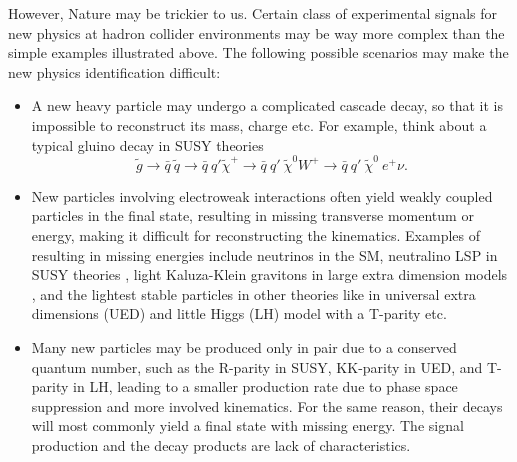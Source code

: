 \documentclass[prd,aps,floats,preprintnumbers,preprint,superscriptaddress,floatfix,nofootinbib]{revtex4}
\begin{document}
However, Nature may be trickier to us. Certain class of 
experimental signals for new physics at  hadron collider environments
may be way more complex than the simple examples illustrated above.
The following possible scenarios may make the new physics identification
difficult:
\begin{itemize}
\item A new heavy particle may undergo a complicated cascade decay, 
so that it is impossible to reconstruct its mass, charge etc. For example, think
about a typical gluino decay \cite{cascade} in SUSY theories 
$$\tilde g\to \bar q\ \tilde q \to \bar q\ q' \tilde\chi^+ \to \bar q\ q' \ \tilde\chi^0 W^+ 
\to \bar q\ q'  \ \tilde\chi^0\ e^+ \nu.$$
\item New particles involving electroweak interactions often yield weakly
coupled particles in the final state, resulting in missing transverse momentum
or energy, making it difficult for reconstructing the kinematics. 
Examples of resulting in missing energies 
include neutrinos in the SM, neutralino LSP in SUSY theories \cite{HaberKane}, 
light Kaluza-Klein gravitons in large extra dimension models \cite{GRW-HLZ},
and the lightest stable particles in other theories like in universal extra dimensions
(UED) \cite{UED} and little Higgs (LH) model with a T-parity \cite{T-P} etc.
\item Many new particles may be produced only in pair due to a conserved quantum
number, such as the R-parity in SUSY, KK-parity in UED, and T-parity in LH,
leading to a smaller production rate due to phase space suppression 
and more involved kinematics. 
For the same reason, their decays will most commonly yield a  final state
with missing energy. The signal production and the decay products are
 lack of characteristics.
\end{itemize}
\end{document}
